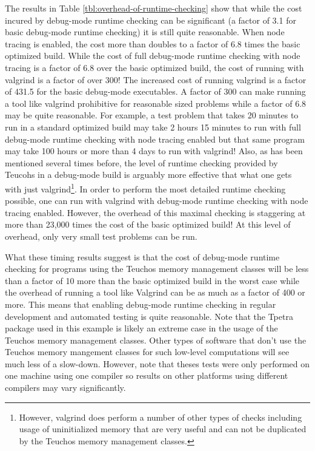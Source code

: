 \documentclass[pdf,ps2pdf,11pt]{SANDreport}
\begin{document}
The results in Table {}\ref{tbl:overhead-of-runtime-checking} show
that while the cost incured by debug-mode runtime checking can be
significant (a factor of 3.1 for basic debug-mode runtime checking) it
is still quite reasonable.  When node tracing is enabled, the cost
more than doubles to a factor of 6.8 times the basic optimized build.
While the cost of full debug-mode runtime checking with node tracing
is a factor of 6.8 over the basic optimized build, the cost of running
with valgrind is a factor of over 300!  The increased cost of running
valgrind is a factor of 431.5 for the basic debug-mode executables.  A
factor of 300 can make running a tool like valgrind prohibitive for
reasonable sized problems while a factor of 6.8 may be quite
reasonable.  For example, a test problem that takes 20 minutes to run
in a standard optimized build may take 2 hours 15 minutes to run with
full debug-mode runtime checking with node tracing enabled but that
same program may take 100 hours or more than 4 days to run with
valgrind!  Also, as has been mentioned several times before, the level
of runtime checking provided by Teucohs in a debug-mode build is
arguably more effective that what one gets with just
valgrind\footnote{However, valgrind does perform a number of other
types of checks including usage of uninitialized memory that are very
useful and can not be duplicated by the Teuchos memory management
classes.}.  In order to perform the most detailed runtime checking
possible, one can run with valgrind with debug-mode runtime checking
with node tracing enabled.  However, the overhead of this maximal
checking is staggering at more than 23,000 times the cost of the basic
optimized build!  At this level of overhead, only very small test
problems can be run.

What these timing results suggest is that the cost of debug-mode
runtime checking for programs using the Teuchos memory management
classes will be less than a factor of 10 more than the basic optimized
build in the worst case while the overhead of running a tool like
Valgrind can be as much as a factor of 400 or more.  This means that
enabling debug-mode runtime checking in regular development and
automated testing is quite reasonable.  Note that the Tpetra package
used in this example is likely an extreme case in the usage of the
Teuchos memory management classes.  Other types of software that don't
use the Teuchos memory mangement classes for such low-level
computations will see much less of a slow-down.  However, note that
theses tests were only performed on one machine using one compiler so
results on other platforms using different compilers may vary
significantly.
\end{document}
